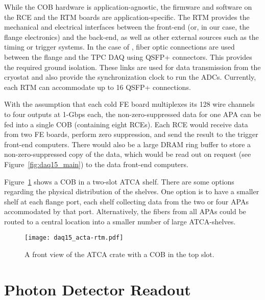 While the COB hardware is application-agnostic, the firmware and
software on the RCE and the RTM boards are application-specific. The
RTM provides the mechanical and electrical interfaces between the
front-end (or, in our case, the flange electronics) and the back-end,
as well as other external sources such as the timing or trigger
systems.  In the case of \LBNE,
fiber optic connections are used between
the flange and the TPC DAQ using QSFP+ connectors. This provides the required ground isolation.  These links are used for data transmission from the cryostat and also provide the synchronization clock to run the ADCs.  Currently, each
RTM can accommodate up to 16 QSFP+ connections.

With 
the assumption that each cold FE board multiplexes its 128 wire
channels to four outputs at 1-Gbps each, the non-zero-suppressed data for
one APA can be fed into a single COB (containing eight RCEs).  Each RCE
would receive data from two FE boards, perform zero suppression, and
send the result to the trigger front-end computers.  There would also
be a large DRAM ring buffer to store a non-zero-suppressed copy of the
data, which would be read out on request (see
Figure~\ref{fig:daq15_main}) to the data front-end computers.

Figure~\ref{fig:daq15_atcapic} shows a COB in a two-slot ATCA shelf.
There are some options regarding the physical distribution of the
shelves.  One option is to have a smaller shelf at each flange port,
each shelf collecting data from the two or four APAs accommodated by that
port.  Alternatively, the fibers from all APAs could be routed to a
central location into a smaller number of large ATCA-shelves.

\begin{figure}[hbt]
  \texttt{[image: daq15\_acta-rtm.pdf]}
    \caption{\label{fig:daq15_atcapic}A front view of the ATCA crate with a COB in the top slot. }
\end{figure}

\section{Photon Detector Readout}
\label{sec:daq_ssp}


